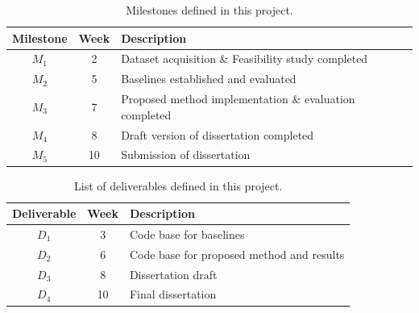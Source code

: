 \documentclass[a4paper,11pt]{article}
\begin{document}
\begin{table}[htbp]
    \begin{center}
        \begin{tabular}{|c|c|l|}
        \hline
        \textbf{Milestone} & \textbf{Week} & \textbf{Description} \\
        \hline
        $M_1$ & 2 & Dataset acquisition \& Feasibility study completed \\
        $M_2$ & 5 & Baselines established and evaluated \\
        $M_3$ & 7 & Proposed method implementation \& evaluation completed \\
        $M_4$ & 8 & Draft version of dissertation completed \\
        $M_5$ & 10 & Submission of dissertation \\
        \hline
        \end{tabular} 
    \end{center}
    \caption{Milestones defined in this project.}
    \label{fig:milestones}
\end{table}

\begin{table}[htbp]
    \begin{center}
        \begin{tabular}{|c|c|l|}
        \hline
        \textbf{Deliverable} & \textbf{Week} & \textbf{Description} \\
        \hline
        $D_1$ & 3 & Code base for baselines \\
        $D_2$ & 6 & Code base for proposed method and results \\
        $D_3$ & 8 & Dissertation draft \\
        $D_4$ & 10 & Final dissertation \\
        \hline
        \end{tabular} 
    \end{center}
    \caption{List of deliverables defined in this project.}
    \label{fig:deliverables}
\end{table}
\vskip -20mm

{\small
}
\end{document}
